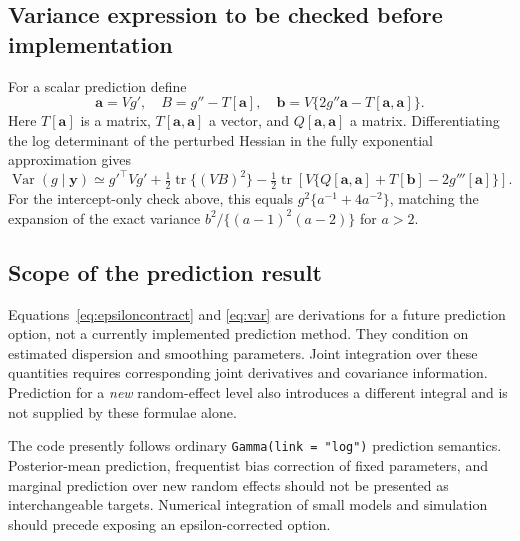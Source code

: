 \documentclass[11pt,a4paper]{article}
\newcommand{\Var}{\operatorname{Var}}
\newcommand{\tr}{\operatorname{tr}}
\newcommand{\code}[1]{\texttt{#1}}
\begin{document}
\subsection{Variance expression to be checked before implementation}
For a scalar prediction define
\[
 \bm a=Vg',\quad B=g''-T[\bm a],\quad
 \bm b=V\{2g''\bm a-T[\bm a,\bm a]\}.
\]
Here $T[\bm a]$ is a matrix, $T[\bm a,\bm a]$ a vector, and
$Q[\bm a,\bm a]$ a matrix. Differentiating the log determinant of the
perturbed Hessian in the fully exponential approximation gives
\begin{equation}
 \Var(g\mid\bm y)\simeq
 g'^\top Vg'
 +\tfrac12\tr\{(VB)^2\}
 -\tfrac12\tr\left[V\{Q[\bm a,\bm a]+T[\bm b]-2g'''[\bm a]\}\right].
 \label{eq:var}
\end{equation}
For the intercept-only check above, this equals
$g^2\{a^{-1}+4a^{-2}\}$, matching the expansion of the exact variance
$b^2/\{(a-1)^2(a-2)\}$ for $a>2$.

\subsection{Scope of the prediction result}
Equations~\eqref{eq:epsiloncontract} and \eqref{eq:var} are derivations for a
future prediction option, not a currently implemented prediction method.
They condition on estimated dispersion and smoothing parameters. Joint
integration over these quantities requires corresponding joint derivatives
and covariance information. Prediction for a \emph{new} random-effect level
also introduces a different integral and is not supplied by these formulae
alone.

The code presently follows ordinary \code{Gamma(link = "log")} prediction
semantics. Posterior-mean prediction, frequentist bias correction of fixed
parameters, and marginal prediction over new random effects should not be
presented as interchangeable targets. Numerical integration of small models
and simulation should precede exposing an epsilon-corrected option.

\newpage
\end{document}
